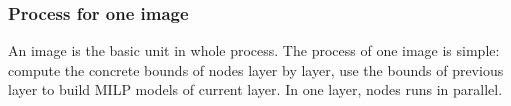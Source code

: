 \documentclass{llncs}
\begin{document}
\subsubsection*{Process for one image} An image is the basic unit in whole process. The process of one image is simple: compute the concrete bounds of nodes layer by layer, use the bounds of previous layer to build MILP models of current layer. In one layer, nodes runs in parallel.






%
%
\end{document}
